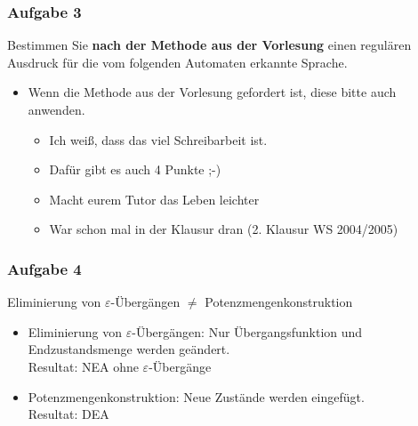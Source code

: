 \begin{frame}
	\frametitle{Aufgabe 3}
		Bestimmen Sie \textbf{nach der Methode aus der Vorlesung} einen regulären Ausdruck für die vom folgenden Automaten erkannte Sprache.
	
		\begin{itemize}
			\item Wenn die Methode aus der Vorlesung gefordert ist, diese bitte auch anwenden.
			\begin{itemize}
				\item Ich weiß, dass das viel Schreibarbeit ist.
				\item Dafür gibt es auch 4 Punkte ;-)
				\item Macht eurem Tutor das Leben leichter				
				\item War schon mal in der Klausur dran (2. Klausur WS 2004/2005)
			\end{itemize}
		\end{itemize}

	
\end{frame}
\begin{frame}
	
	\frametitle{Aufgabe 4}
		Eliminierung von $\varepsilon$-Übergängen $\neq$ Potenzmengenkonstruktion
		\begin{itemize}
			\item Eliminierung von $\varepsilon$-Übergängen: Nur Übergangsfunktion und Endzustandsmenge werden geändert. \\ Resultat: NEA ohne $\varepsilon$-Übergänge
			\item Potenzmengenkonstruktion: Neue Zustände werden eingefügt. \\ Resultat: DEA
		\end{itemize}
\end{frame}

